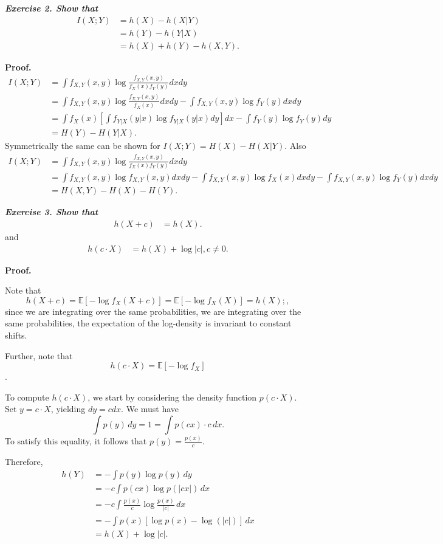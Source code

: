 \textbf{\textit{Exercise 2.   Show that}}
\begin{align*}
I(X; Y) &= h(X) - h(X | Y) \\
		&= h(Y) - h(Y | X) \\
        &= h(X) + h(Y) - h(X, Y).
\end{align*}

\textbf{Proof.}
\begin{align*}
I(X;Y)&=\int f_{X,Y}(x,y)\log\frac{f_{X,Y}(x,y)}{f_X(x)f_Y(y)}dxdy\\
&=\int f_{X,Y}(x,y)\log\frac{f_{X,Y}(x,y)}{f_X(x)}dxdy-\int f_{X,Y}(x,y)\log f_Y(y)dxdy\\
&=\int f_X(x) \left [ \int f_{Y|X}(y|x)\log f_{Y|X}(y|x)dy \right ] dx-\int f_{Y}(y)\log f_Y(y)dy\\
&=H(Y)-H(Y|X). 
\end{align*}
Symmetrically the same can be shown for $I(X;Y)=H(X)-H(X|Y).$ Also
\begin{align*}
I(X;Y)&=\int f_{X,Y}(x,y)\log\frac{f_{X,Y}(x,y)}{f_X(x)f_Y(y)}dxdy\\
&=\int f_{X,Y}(x,y)\log f_{X,Y}(x,y)dxdy-\int f_{X,Y}(x,y)\log f_X(x)dxdy-\int f_{X,Y}(x,y)\log f_Y(y)dxdy\\
&=H(X,Y)-H(X)-H(Y).
\end{align*}

\textbf{\textit{Exercise 3.   Show that}}
\begin{align*}
h(X + c) &= h(X).
\end{align*}
and
\begin{align*}
h(c \cdot X) &= h(X) + \log \lvert c\rvert, c\neq 0.
\end{align*}

\textbf{Proof.} 

Note that
\[
h(X+c) = \mathbb{E} [-\log f_X(X+c)] = \mathbb{E}[-\log f_X(X)] = h(X);,
\]
since we are integrating over the same probabilities, we are integrating over the same probabilities, the expectation of the log-density is invariant to constant shifts.

Further, note that
\[
h(c \cdot X) = \mathbb{E} [- \log f_X]
\].

To compute $h(c \cdot X)$, we start by considering the density function $p(c \cdot X)$.  Set $y = c \cdot X$, yielding $dy = c dx$.  We must have
\[
\int p(y) \, dy = 1 = \int p(cx) \cdot c \, dx.
\]
To satisfy this equality, it follows that  $p(y) = \frac{p(x)}{c}$.

Therefore,
\begin{align*}
h(Y) &= - \int p(y) \log p(y) \, dy \\
	 &= - c \int p(cx) \log p(|cx|) \, dx \\
     &= -c \int \frac{p(x)}{c} \log \frac{p(x)}{|c|} \, dx \\
     &= - \int p(x) [\log p(x) - \log(|c|)] \, dx \\
     &= h(X) + \log |c|.
\end{align*}

